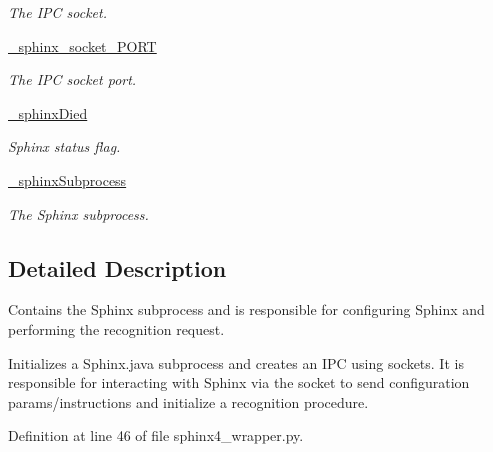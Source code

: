 \begin{DoxyCompactItemize}
\begin{DoxyCompactList}\small\item\em The I\-P\-C socket. \end{DoxyCompactList}\item 
\hyperlink{classrapp__speech__detection__sphinx4_1_1sphinx4__wrapper_1_1Sphinx4Wrapper_a01d764c85e252be352a991b0cdea11eb}{\-\_\-sphinx\-\_\-socket\-\_\-\-P\-O\-R\-T}
\begin{DoxyCompactList}\small\item\em The I\-P\-C socket port. \end{DoxyCompactList}\item 
\hyperlink{classrapp__speech__detection__sphinx4_1_1sphinx4__wrapper_1_1Sphinx4Wrapper_a069497790b485de857733d8d5b6ba592}{\-\_\-sphinx\-Died}
\begin{DoxyCompactList}\small\item\em Sphinx status flag. \end{DoxyCompactList}\item 
\hyperlink{classrapp__speech__detection__sphinx4_1_1sphinx4__wrapper_1_1Sphinx4Wrapper_ace5cad8dbe7ccd9870d3dadc165cff0e}{\-\_\-sphinx\-Subprocess}
\begin{DoxyCompactList}\small\item\em The Sphinx subprocess. \end{DoxyCompactList}\end{DoxyCompactItemize}


\subsection{Detailed Description}
Contains the Sphinx subprocess and is responsible for configuring Sphinx and performing the recognition request. 

Initializes a Sphinx.\-java subprocess and creates an I\-P\-C using sockets. It is responsible for interacting with Sphinx via the socket to send configuration params/instructions and initialize a recognition procedure. 

Definition at line 46 of file sphinx4\-\_\-wrapper.\-py.



